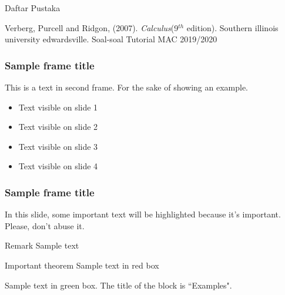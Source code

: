 \documentclass{beamer}
\begin{document}
\begin{frame}{Daftar Pustaka}
	\begin{thebibliography}{9}
		Verberg, Purcell and Ridgon, (2007). \textit{Calculus}(9$^{th}$ edition). Southern illinois university edwardsville.
		Soal-soal Tutorial MAC 2019/2020
	\end{thebibliography}
\end{frame}


\newpage
\begin{frame}
\frametitle{Sample frame title}
This is a text in second frame. 
For the sake of showing an example.

\begin{itemize}
	\item<1-> Text visible on slide 1
	\item<2-> Text visible on slide 2
	\item<3> Text visible on slide 3
	\item<4-> Text visible on slide 4
\end{itemize}

\end{frame}



\newpage
\begin{frame}
\frametitle{Sample frame title}

In this slide, some important text will be
\alert{highlighted} because it's important.
Please, don't abuse it.

\begin{block}{Remark}
Sample text
\end{block}

\begin{alertblock}{Important theorem}
Sample text in red box
\end{alertblock}

\begin{examples}
Sample text in green box. The title of the block is ``Examples".
\end{examples}
\end{frame}
\end{document}
